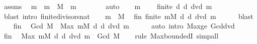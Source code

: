 \begin{isabellebody}
\ assms\ \isamarkupfalse%
\ m\ \ {\isachardoublequoteopen}m\ {\isasymin}\ M{\isachardoublequoteclose}\ \ {\isachardoublequoteopen}m\ {\isachargreater}{\kern0pt}\ {}{\isachardoublequoteclose}\isanewline
\ \ \ \ \isamarkupfalse%
\ auto\isanewline
\ \ \isamarkupfalse%
\ {\isacartoucheopen}m\ {\isachargreater}{\kern0pt}\ {}{\isacartoucheclose}\ \isamarkupfalse%
\ {\isachardoublequoteopen}finite\ {\isacharbraceleft}{\kern0pt}d{\isachardot}{\kern0pt}\ d\ dvd\ m{\isacharbraceright}{\kern0pt}{\isachardoublequoteclose}\isanewline
\ \ \ \ \isamarkupfalse%
\ {\isacharparenleft}{\kern0pt}blast\ intro{\isacharcolon}{\kern0pt}\ finite{\isacharunderscore}{\kern0pt}divisors{\isacharunderscore}{\kern0pt}nat{\isacharparenright}{\kern0pt}\isanewline
\ \ \isamarkupfalse%
\ {\isacartoucheopen}m\ {\isasymin}\ M{\isacartoucheclose}\ \isamarkupfalse%
\ fin{\isacharcolon}{\kern0pt}\ {\isachardoublequoteopen}finite\ {\isacharparenleft}{\kern0pt}{\isasymInter}m{\isasymin}M{\isachardot}{\kern0pt}\ {\isacharbraceleft}{\kern0pt}d{\isachardot}{\kern0pt}\ d\ dvd\ m{\isacharbraceright}{\kern0pt}{\isacharparenright}{\kern0pt}{\isachardoublequoteclose}\isanewline
\ \ \ \ \isamarkupfalse%
\ blast\isanewline
\ \ \isamarkupfalse%
\ fin\ \isamarkupfalse%
\ {\isachardoublequoteopen}Gcd\ M\ {\isasymle}\ Max\ {\isacharparenleft}{\kern0pt}{\isasymInter}m{\isasymin}M{\isachardot}{\kern0pt}\ {\isacharbraceleft}{\kern0pt}d{\isachardot}{\kern0pt}\ d\ dvd\ m{\isacharbraceright}{\kern0pt}{\isacharparenright}{\kern0pt}{\isachardoublequoteclose}\isanewline
\ \ \ \ \isamarkupfalse%
\ {\isacharparenleft}{\kern0pt}auto\ intro{\isacharcolon}{\kern0pt}\ Max{\isacharunderscore}{\kern0pt}ge\ Gcd{\isacharunderscore}{\kern0pt}dvd{\isacharparenright}{\kern0pt}\isanewline
\ \ \isamarkupfalse%
\ fin\ \isamarkupfalse%
\ {\isachardoublequoteopen}Max\ {\isacharparenleft}{\kern0pt}{\isasymInter}m{\isasymin}M{\isachardot}{\kern0pt}\ {\isacharbraceleft}{\kern0pt}d{\isachardot}{\kern0pt}\ d\ dvd\ m{\isacharbraceright}{\kern0pt}{\isacharparenright}{\kern0pt}\ {\isasymle}\ Gcd\ M{\isachardoublequoteclose}\isanewline
\ \ \isamarkupfalse%
\ {\isacharparenleft}{\kern0pt}rule\ Max{\isachardot}{\kern0pt}boundedI{\isacharcomma}{\kern0pt}\ simp{\isacharunderscore}{\kern0pt}all{\isacharparenright}{\kern0pt}\isanewline
\ \ \ \ \isamarkupfalse%

\end{isabellebody}
